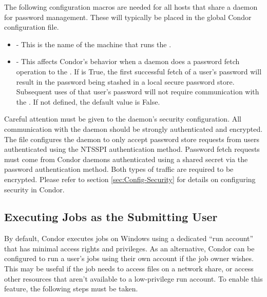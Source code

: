 The following configuration macros are needed for all hosts that share
a  daemon for password management.  These will typically be
placed in the global Condor configuration file.
\begin{itemize}
\item {} - This is the name of the machine that runs
      the .
\item {} - This affects Condor's behavior
      when a daemon does a password fetch operation to the
      . If  is True, the
      first successful fetch of a user's password will result in the
      password being stashed in a local secure password
      store. Subsequent uses of that user's password will not require
      communication with the .  If not defined, the default
      value is False.
\end{itemize}

Careful attention must be given to the  daemon's security
configuration.  All communication with the  daemon should be
strongly authenticated and encrypted.  The
 file configures the 
daemon
to only accept password store requests from users authenticated
using the NTSSPI authentication method.  Password fetch requests must
come from Condor daemons authenticated using a shared secret via the
password authentication method.  Both types of traffic are required to
be encrypted.  Please refer to section \ref{sec:Config-Security} for
details on configuring security in Condor.

\subsection{\label{sec:windows-run-as-owner}Executing Jobs as the Submitting User}

By default, Condor executes jobs on Windows using a dedicated ``run
account'' that has minimal access rights and privileges.  As an
alternative, Condor can be configured to run a user's jobs using their
own account if the job owner wishes. This may be useful if the job
needs to access files on a network share, or access other resources
that aren't available to a low-privilege run account. To enable this
feature, the following steps must be taken.

